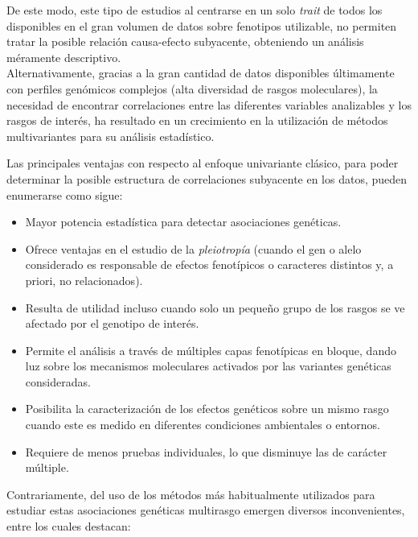 \documentclass[IB,BIB]{TFUOC}%
\begin{document}
De este modo, este tipo de estudios al centrarse en un solo \textit{trait} de todos los disponibles en el gran volumen de datos sobre fenotipos utilizable, no permiten tratar la posible relación causa-efecto subyacente, obteniendo un análisis méramente descriptivo. \\


Alternativamente, gracias a la gran cantidad de datos disponibles últimamente con perfiles genómicos complejos (alta diversidad de rasgos moleculares), la necesidad de encontrar correlaciones entre las diferentes variables analizables y los rasgos de interés, ha resultado en un crecimiento en la utilización de métodos multivariantes para su análisis estadístico.

Las principales ventajas con respecto al enfoque univariante clásico, para poder determinar la posible estructura de correlaciones subyacente en los datos, pueden enumerarse como sigue:

{\small
\begin{itemize}
    \item Mayor potencia estadística para detectar asociaciones genéticas.
    \item Ofrece ventajas en el estudio de la \textit{pleiotropía} (cuando el gen o alelo considerado es responsable de efectos fenotípicos o caracteres distintos y, a priori, no relacionados).
    \item Resulta de utilidad incluso cuando solo un pequeño grupo de los rasgos se ve afectado por el genotipo de interés.
    \item Permite el análisis a través de múltiples capas fenotípicas en bloque, dando luz sobre los mecanismos moleculares activados por las variantes genéticas consideradas.
    \item Posibilita la caracterización de los efectos genéticos sobre un mismo rasgo cuando este es medido en diferentes condiciones ambientales o entornos.
    \item Requiere de menos pruebas individuales, lo que disminuye las de carácter múltiple.
\end{itemize}}

Contrariamente, del uso de los métodos más habitualmente utilizados para estudiar estas asociaciones genéticas multirasgo emergen diversos inconvenientes, entre los cuales destacan:
\end{document}
